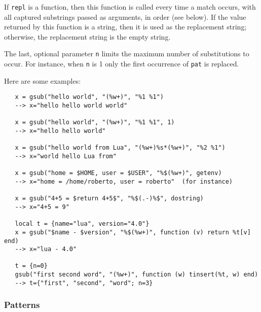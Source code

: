 \documentclass[11pt]{article}
\begin{document}
If \verb|repl| is a function, then this function is called every time a
match occurs, with all captured substrings passed as arguments,
in order (see below).
If the value returned by this function is a string,
then it is used as the replacement string;
otherwise, the replacement string is the empty string.

The last, optional parameter \verb|n| limits
the maximum number of substitutions to occur.
For instance, when \verb|n| is 1 only the first occurrence of
\verb|pat| is replaced.

Here are some examples:
\begin{verbatim}
   x = gsub("hello world", "(%w+)", "%1 %1")
   --> x="hello hello world world"

   x = gsub("hello world", "(%w+)", "%1 %1", 1)
   --> x="hello hello world"

   x = gsub("hello world from Lua", "(%w+)%s*(%w+)", "%2 %1")
   --> x="world hello Lua from"

   x = gsub("home = $HOME, user = $USER", "%$(%w+)", getenv)
   --> x="home = /home/roberto, user = roberto"  (for instance)

   x = gsub("4+5 = $return 4+5$", "%$(.-)%$", dostring)
   --> x="4+5 = 9"

   local t = {name="lua", version="4.0"}
   x = gsub("$name - $version", "%$(%w+)", function (v) return %t[v] end)
   --> x="lua - 4.0"

   t = {n=0}
   gsub("first second word", "(%w+)", function (w) tinsert(%t, w) end)
   --> t={"first", "second", "word"; n=3}
\end{verbatim}


\subsubsection*{Patterns} \label{pm}
\end{document}
